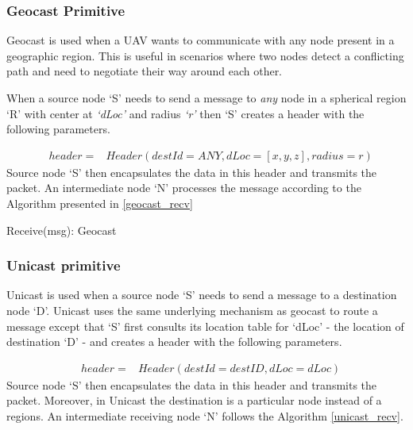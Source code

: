 \subsubsection{Geocast Primitive}

Geocast is used when a UAV wants to communicate with any node present in a geographic region. This is useful in scenarios where two nodes detect a conflicting path and need to negotiate their way around each other.  

When a source node `S' needs to send a message to \emph{any} node in a spherical region `R' with center at \emph{`dLoc'} and radius \emph{`r'} then `S' creates a header with the following parameters.

\begin{eqnarray*}
& header = & Header(destId=ANY, dLoc=[x,y,z], radius=r)
\end{eqnarray*}
Source node `S' then encapsulates the data in this header and transmits the packet. An intermediate node `N' processes the message according to the Algorithm presented in \ref{geocast_recv}

\begin{algorithm}
\caption{Receive(msg): Geocast} 
\label{geocast_recv}
\DontPrintSemicolon
{}
\end{algorithm}



\subsubsection{Unicast primitive}

Unicast is used when a source node `S' needs to send a message to a destination node `D'. Unicast uses the same underlying mechanism as geocast to route a message except that `S' first consults its location table for `dLoc' - the location of destination `D' - and creates a header with the following parameters.

\begin{eqnarray*}
& header = & Header(destId = destID, dLoc = dLoc)
\end{eqnarray*}
Source node `S' then encapsulates the data in this header and transmits the packet. Moreover, in Unicast the destination is a particular node instead of a regions. An intermediate receiving node `N' follows the Algorithm \ref{unicast_recv}.

